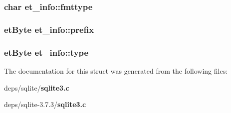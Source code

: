 \subsubsection{\setlength{\rightskip}{0pt plus 5cm}char \bf{et\_\-info::fmttype}}\label{structet__info_d4d3740bf753f9706957051c03cedfb3}


\subsubsection{\setlength{\rightskip}{0pt plus 5cm}\bf{et\-Byte} \bf{et\_\-info::prefix}}\label{structet__info_69c746415095e27b838ad32c87f7edc9}


\subsubsection{\setlength{\rightskip}{0pt plus 5cm}\bf{et\-Byte} \bf{et\_\-info::type}}\label{structet__info_0892d0073985b56aa8a9131425435bb0}




The documentation for this struct was generated from the following files:\begin{CompactItemize}
\item 
deps/sqlite/\bf{sqlite3.c}\item 
deps/sqlite-3.7.3/\bf{sqlite3.c}\end{CompactItemize}
